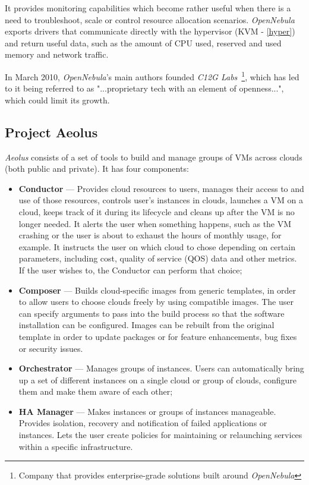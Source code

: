 It provides monitoring capabilities which become rather useful when there is a need to troubleshoot, scale or control resource allocation scenarios. \textit{OpenNebula} exports drivers that communicate directly with the hypervisor (KVM - \ref{hyper}) and return useful data, such as the amount of CPU used, reserved and used memory and network traffic.\cite{open-clouds}

In March 2010, \textit{OpenNebula}'s main authors founded \textit{C12G Labs}~\footnote{Company that provides enterprise-grade solutions built around \textit{OpenNebula}}, which has led to it being referred to as "...proprietary tech with an element of openness...", which could limit its growth.~\cite{linkedin-opennebula}

\subsection{Project Aeolus}\label{subsec:aeolus}

\textit{Aeolus} consists of a set of tools to build and manage groups of VMs across clouds (both public and private). It has four components:

\begin{itemize}
\item \textbf{Conductor} --- Provides cloud resources to users, manages their access to and use of those resources, controls user's instances in clouds, launches a VM on a cloud, keeps track of it during its lifecycle and cleans up after the VM is no longer needed. It alerts the user when something happens, such as the VM crashing or the user is about to exhaust the hours of monthly usage, for example. It instructs the user on which cloud to chose depending on certain parameters, including cost, quality of service (QOS) data and other metrics. If the user wishes to, the Conductor can perform that choice;
\item \textbf{Composer} --- Builds cloud-specific images from generic templates, in order to allow users to choose clouds freely by using compatible images. The user can specify arguments to pass into the build process so that the software installation can be configured. Images can be rebuilt from the original template in order to update packages or for feature enhancements, bug fixes or security issues.
\item \textbf{Orchestrator} --- Manages groups of instances. Users can automatically bring up a set of different instances on a single cloud or group of clouds, configure them and make them aware of each other;
\item \textbf{HA Manager} --- Makes instances or groups of instances manageable. Provides isolation, recovery and notification of failed applications or instances. Lets the user create policies for maintaining or relaunching services within a specific infrastructure.
\end{itemize}

